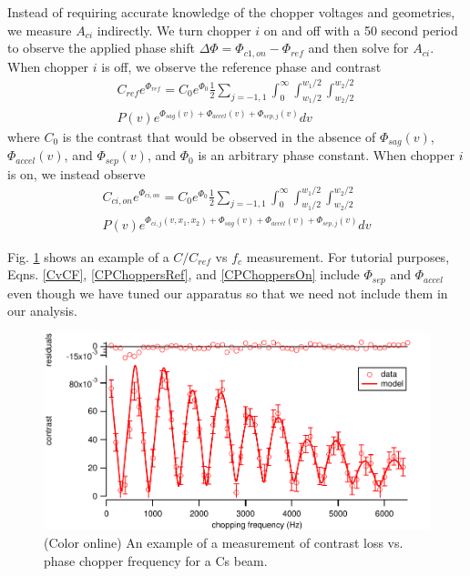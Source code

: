 \documentclass[twocolumn, prl,showpacs,superscriptaddress]{revtex4-1}   %
\newcommand{\figref}[1]{Fig. \ref{#1}}
\begin{document}
Instead of requiring accurate knowledge of the chopper voltages and geometries, we measure $A_{ci}$ indirectly. We turn chopper $i$ on and off with a 50 second period to observe the applied phase shift $\Delta\Phi = \Phi_{c1,on} - \Phi_{ref}$ and then solve for $A_{ci}$. When chopper $i$ is off, we observe the reference phase and contrast 
\begin{align}
	C_{ref}e^{\Phi_{ref}} = 
		C_0e^{\Phi_0} \frac{1}{2} \sum_{j=-1,1}
		\int_0^{\infty}
		\int_{w_1/2}^{w_1/2}
		\int_{w_2/2}^{w_2/2} 
		\nonumber \\
		P(v) e^{\Phi_{sag}(v) + \Phi_{accel}(v) + \Phi_{sep,j}(v)} 
		dv
	\label{CPChoppersRef}
\end{align}
where $C_0$ is the contrast that would be observed in the absence of $\Phi_{sag}(v)$, $\Phi_{accel}(v)$, and $\Phi_{sep}(v)$, and $\Phi_0$ is an arbitrary phase constant. When chopper $i$ is on, we instead observe
\begin{align}
	C_{ci,on}e^{\Phi_{ci,on}} = 
		C_0e^{\Phi_0} \frac{1}{2} \sum_{j=-1,1}
		\int_0^{\infty}
		\int_{w_1/2}^{w_1/2}
		\int_{w_2/2}^{w_2/2} 
		\nonumber \\
		P(v) e^{\Phi_{ci,j}(v,x_1,x_2) + \Phi_{sag}(v) + \Phi_{accel}(v) + \Phi_{sep,j}(v)} 
		dv
	\label{CPChoppersOn}
\end{align}

\figref{CvCFExample} shows an example of a $C/C_{ref}$ vs $f_c$ measurement. 
For tutorial purposes, Eqns. \eqref{CvCF}, \eqref{CPChoppersRef}, and \eqref{CPChoppersOn} include $\Phi_{sep}$ and $\Phi_{accel}$ even though we have tuned our apparatus so that we need not include them in our analysis.

\begin{figure}
\includegraphics[width=\linewidth,keepaspectratio]{CvCF_150420_o.pdf}
\caption{\label{CvCFExample}(Color online) An example of a measurement of contrast loss vs. phase chopper frequency for a Cs beam.}
\end{figure}
	
\end{document}
